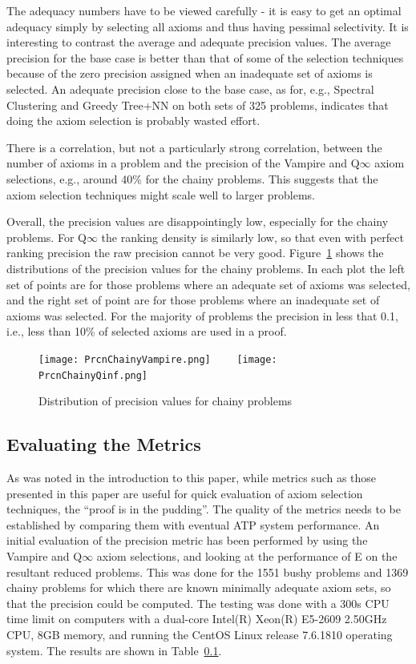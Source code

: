 \documentclass[EPiC]{easychair}
\begin{document}
The adequacy numbers have to be viewed carefully - it is easy to get an
optimal adequacy simply by selecting all axioms and thus having pessimal
selectivity.
It is interesting to contrast the average and adequate precision values.
The average precision for the base case is better than that of some of the
selection techniques because of the zero precision assigned when an inadequate
set of axioms is selected.
An adequate precision close to the base case, as for, e.g., Spectral 
Clustering and Greedy Tree+NN on both sets of 325 problems,
indicates that doing the axiom selection is probably wasted effort.

There is a correlation, but not a particularly strong correlation, between 
the number of axioms in a problem and the precision of the Vampire and 
Q$\infty$ axiom selections, e.g., around 40\% for the chainy problems.
This suggests that the axiom selection techniques might scale well to
larger problems.

Overall, the precision values are disappointingly low, especially for the
chainy problems.
For Q$\infty$ the ranking density is similarly low, so that even with perfect
ranking precision the raw precision cannot be very good.
Figure~\ref{fig:PrcnChainy} shows the distributions of the precision values
for the chainy problems.
In each plot the left set of points are for those problems where an adequate
set of axioms was selected, and the right set of point are for those problems
where an inadequate set of axioms was selected.
For the majority of problems the precision in less that 0.1, i.e., less than
10\% of selected axioms are used in a proof.

\begin{figure}[h]
\centering
\texttt{[image: PrcnChainyVampire.png]}~~~~
\texttt{[image: PrcnChainyQinf.png]}
\caption{Distribution of precision values for chainy problems}
\label{fig:PrcnChainy}
\end{figure}

\subsection{Evaluating the Metrics}
\label{EvaluationOfMetrics}

As was noted in the introduction to this paper, while metrics such as
those presented in this paper are useful for quick evaluation of axiom
selection techniques, the ``proof is in the pudding''.
The quality of the metrics needs to be established by comparing them with 
eventual ATP system performance.
An initial evaluation of the precision metric has been performed by using
the Vampire and Q$\infty$ axiom selections, and looking at the performance 
of E on the resultant reduced problems.
This was done for the 1551 bushy problems and 1369 chainy problems for
which there are known minimally adequate axiom sets, so that the precision 
could be computed.
The testing was done with a 300s CPU time limit on 
computers with a dual-core Intel(R) Xeon(R) E5-2609 2.50GHz CPU,
8GB memory, and running the CentOS Linux release 7.6.1810 operating system.
The results are shown in Table~\ref{EvaluationOfMetrics}.
\end{document}
